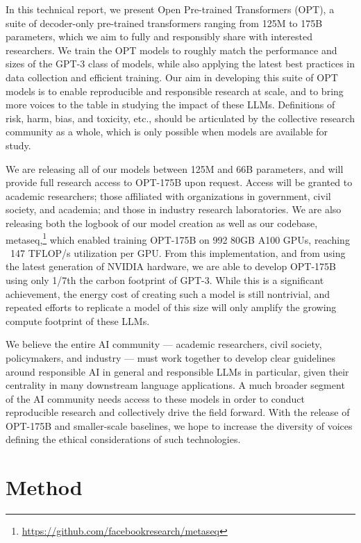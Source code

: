 \documentclass[11pt]{article}
\newcommand{\OPT}[0]{{OPT-175B}}
\newcommand{\biggpt}[1]{{GPT-3#1}}
\begin{document}
In this technical report, we present Open Pre-trained Transformers (OPT), a suite of decoder-only pre-trained transformers ranging from 125M to 175B parameters, which we aim to fully and responsibly share with interested researchers. We train the OPT models to roughly match the performance and sizes of the GPT-3 class of models, while also applying the latest best practices in data collection and efficient training. Our aim in developing this suite of OPT models is to enable reproducible and responsible research at scale, and to bring more voices to the table in studying the impact of these LLMs.  Definitions of risk, harm, bias, and toxicity, etc., should be articulated by the collective research community as a whole, which is only possible when models are available for study.  

We are releasing all of our models between 125M and 66B parameters, and will provide full research access to OPT-175B upon request. Access will be granted to academic researchers; those affiliated with organizations in government, civil society, and academia; and those in industry research laboratories. 
We are also releasing both the logbook of our model creation as well as our codebase, {metaseq},\footnote{\url{https://github.com/facebookresearch/metaseq}} which enabled training \OPT{} on 992 80GB A100 GPUs, reaching ~147 TFLOP/s utilization per GPU.  From this implementation, and from using the latest generation of NVIDIA hardware, we are able to develop \OPT{} using only 1/7th the carbon footprint of \biggpt{.}  While this is a significant achievement, the energy cost of creating such a model is still nontrivial, and repeated efforts to replicate a model of this size will only amplify the growing compute footprint of these LLMs.

We believe the entire AI community — academic researchers, civil society, policymakers, and industry — must work together to develop clear guidelines around responsible AI in general and responsible LLMs in particular, given their centrality in many downstream language applications. A much broader segment of the AI community needs access to these models in order to conduct reproducible research and collectively drive the field forward. With the release of OPT-175B and smaller-scale baselines, we hope to increase the diversity of voices defining the ethical considerations of such technologies.
 \section{Method}
\label{sec:method}
\end{document}
